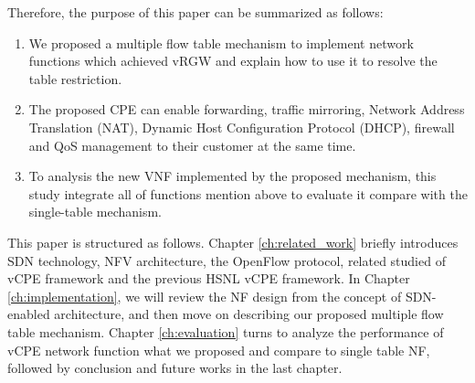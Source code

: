 Therefore, the purpose of this paper can be summarized as follows:
\begin{enumerate}

\item We proposed a multiple flow table mechanism to implement network functions which achieved vRGW and explain how to use it to resolve the table restriction.
\item The proposed CPE can enable forwarding, traffic mirroring, Network Address Translation (NAT), Dynamic Host Configuration Protocol (DHCP), firewall and QoS management to their customer at the same time.
\item To analysis the new VNF implemented by the proposed mechanism, this study integrate all of functions mention above to evaluate it compare with the single-table mechanism.
\end{enumerate}

This paper is structured as follows.
Chapter \ref{ch:related_work} briefly introduces SDN technology, NFV architecture, the OpenFlow protocol, related studied of vCPE framework and the previous HSNL vCPE framework.
In Chapter \ref{ch:implementation}, we will review the NF design from the concept of SDN-enabled \cite{sdn-enabled} architecture, and then move on describing our proposed multiple flow table mechanism.
Chapter \ref{ch:evaluation} turns to analyze the performance of vCPE network function what we proposed and compare to single table NF, followed by conclusion and future works in the last chapter.
